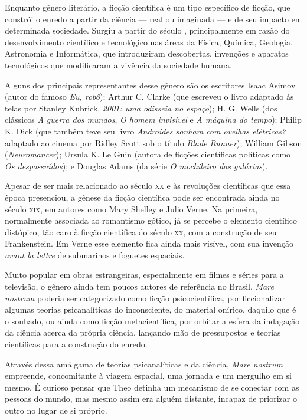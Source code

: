 Enquanto gênero literário, a ficção científica é um tipo específico de ficção, que constrói o enredo a partir da ciência --- real ou imaginada --- e de seu impacto em determinada sociedade. Surgiu a partir do século , principalmente em razão do desenvolvimento científico e tecnológico nas áreas da Física, Química, Geologia, Astronomia e Informática, que introduziram descobertas, invenções e aparatos tecnológicos que modificaram a vivência da sociedade humana.

Alguns dos principais representantes desse gênero são os escritores
Isaac Asimov (autor do famoso \textit{Eu, robô}); Arthur C. Clarke (que escreveu o livro adaptado às telas por Stanley Kubrick, \textit{2001: uma odisseia no espaço}); H. G. Wells (dos clássicos \textit{A guerra dos mundos}, \textit{O homem invisível} e \textit{A máquina do tempo}); Philip K. Dick (que também teve seu livro \textit{Androides sonham com ovelhas elétricas?} adaptado ao cinema por Ridley Scott sob o título \textit{Blade Runner}); William Gibson (\textit{Neuromancer}); Ursula K. Le Guin (autora de ficções científicas políticas como \textit{Os despossuídos}); e Douglas Adams (da série \textit{O mochileiro das galáxias}).

Apesar de ser mais relacionado ao século \textsc{xx} e às revoluções científicas que essa época presenciou, a gênese da ficção científica pode ser encontrada ainda no século \textsc{xix}, em autores como Mary Shelley e Julio Verne.
Na primeira, normalmente associada ao romantismo gótico, já se percebe o elemento científico distópico, tão caro à ficção científica do século \textsc{xx}, com a construção de seu Frankenstein. Em Verne esse elemento fica ainda mais visível, com sua invenção \textit{avant la lettre} de submarinos e foguetes espaciais.

Muito popular em obras estrangeiras, especialmente em filmes e séries para a televisão, o gênero ainda tem poucos autores de referência no Brasil. \emph{Mare nostrum} poderia ser categorizado como ficção psicocientífica, por ficcionalizar algumas teorias psicanalíticas do inconsciente, do material onírico, daquilo que é o sonhado, ou ainda como ficção metacientífica, por orbitar a esfera da indagação da ciência acerca da própria ciência, lançando mão de pressupostos e teorias científicas para a construção do enredo.

Através dessa amálgama de teorias psicanalíticas e da ciência, 
\emph{Mare nostrum} empreende, concomitante à viagem espacial, uma jornada e um mergulho em si mesmo.
É curioso pensar que Theo detinha um mecanismo de se conectar com as
pessoas do mundo, mas mesmo assim era alguém distante, incapaz de
priorizar o outro no lugar de si próprio.

